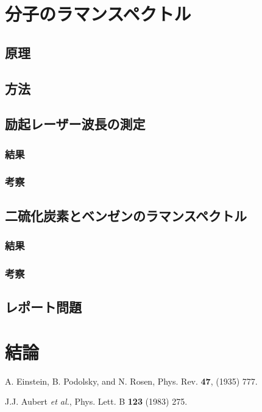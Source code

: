 \documentclass[uplatex,dvipdfmx,a4j,12pt]{jsarticle}
\begin{document}
\newpage

\section{分子のラマンスペクトル}
\subsection{原理}

\subsection{方法}

\subsection{励起レーザー波長の測定}

\subsubsection{結果}

\subsubsection{考察}

\subsection{二硫化炭素とベンゼンのラマンスペクトル}

\subsubsection{結果}

\subsubsection{考察}

\subsection{レポート問題}

\newpage

\section{結論}

\newpage

\begin{thebibliography}{9}

        A. Einstein, B. Podolsky, and N. Rosen, 
        Phys. Rev. \textbf{47}, (1935) 777.

        J.J. Aubert \textit{et al.},
        Phys. Lett. B \textbf{123} (1983) 275.
    
\end{thebibliography}
\end{document}
